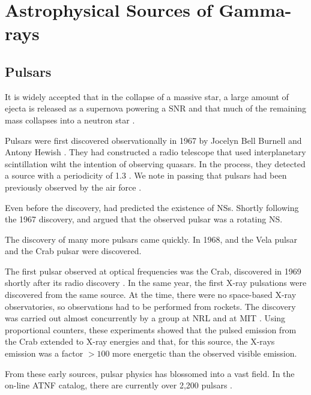 \section{Astrophysical Sources of Gamma-rays}

\subsection{Pulsars}

It is widely accepted that in the collapse of a massive star, a large
amount of ejecta is released as a supernova powering a \ac{SNR}
and that much of the remaining mass collapses into a neutron star
\citep{baade_1934a_remarks-super-novae}.

Pulsars were first discovered observationally in 1967 by Jocelyn Bell
Burnell and Antony Hewish \citep{hewish_1968_observation-rapidly}. They
had constructed a radio telescope that used interplanetary scintillation
wiht the intention of observing quasars.  In the process, they
detected a source with a periodicity of 1.3 \second. We note in
passing that pulsars had been previously observed by the air force
\citep{brumfiel_2007_force-early}.

Even before the discovery, \cite{pacini_1967_energy-emission}
had predicted the existence of \acp{NS}.  Shortly following
the 1967 discovery, \cite{gold_1968_rotating-neutron} and
\cite{pacini_1968_rotating-neutron} argued that the observed pulsar was
a rotating \ac{NS}.

The discovery of many more pulsars came quickly.  In 1968, and the
Vela pulsar \citep{large_1968_pulsar-supernova} and the Crab pulsar
\citep{staelin_1968_pulsating-radio} were discovered.

The first pulsar observed at optical frequencies was the
Crab, discovered in 1969 shortly after its radio discovery
\citep{cocke_1969_discovery-optical}.  In the same year, the first X-ray
pulsations were discovered from the same source. At the time, there were
no space-based X-ray observatories, so observations had to be performed
from rockets.  The discovery was carried out almost concurrently by
a group at \gls{NRL} \citep{fritz_1969_x-ray-pulsar} and at \gls{MIT}
\citep{bradt_1969_x-ray-optical}.  Using proportional counters, these
experiments showed that the pulsed emission from the Crab extended to
X-ray energies and that, for this source, the X-rays emission was a
factor $>100$ more energetic than the observed visible emission.

From these early sources, pulsar physics has blossomed into a vast
field. In the on-line \ac{ATNF} catalog, there are currently over 2,200
pulsars \citep{manchester_2005a_australia-telescope}.

